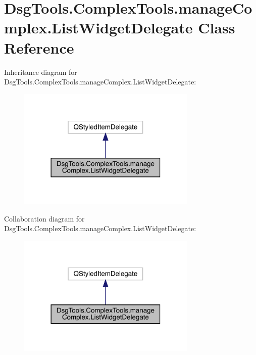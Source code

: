 \hypertarget{class_dsg_tools_1_1_complex_tools_1_1manage_complex_1_1_list_widget_delegate}{}\section{Dsg\+Tools.\+Complex\+Tools.\+manage\+Complex.\+List\+Widget\+Delegate Class Reference}
\label{class_dsg_tools_1_1_complex_tools_1_1manage_complex_1_1_list_widget_delegate}


Inheritance diagram for Dsg\+Tools.\+Complex\+Tools.\+manage\+Complex.\+List\+Widget\+Delegate\+:
\nopagebreak
\begin{figure}[H]
\begin{center}
\leavevmode
\includegraphics[width=242pt]{class_dsg_tools_1_1_complex_tools_1_1manage_complex_1_1_list_widget_delegate__inherit__graph}
\end{center}
\end{figure}


Collaboration diagram for Dsg\+Tools.\+Complex\+Tools.\+manage\+Complex.\+List\+Widget\+Delegate\+:
\nopagebreak
\begin{figure}[H]
\begin{center}
\leavevmode
\includegraphics[width=242pt]{class_dsg_tools_1_1_complex_tools_1_1manage_complex_1_1_list_widget_delegate__coll__graph}
\end{center}
\end{figure}
